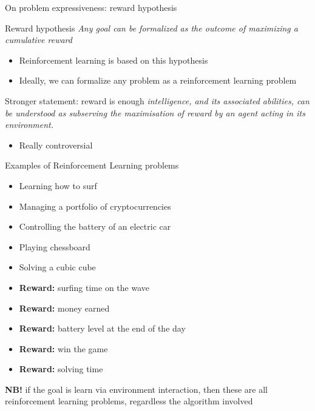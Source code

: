 \documentclass[presentation, 9pt]{beamer}\mode<presentation>{\usetheme{AMSBolognaFC}}
\begin{document}
\begin{frame}{On problem expressiveness: reward hypothesis}
\begin{block}{Reward hypothesis}
\emph{Any goal can be formalized as the outcome of maximizing a cumulative reward}
\begin{itemize}
	\item Reinforcement learning is based on this hypothesis
	\item Ideally, we can formalize any problem as a reinforcement learning problem
\end{itemize}
\end{block}

\begin{alertblock}{Stronger statement: reward is enough}
\emph{intelligence, and its associated abilities, can be understood as subserving the maximisation of reward by an agent acting in its environment.}
\begin{itemize}
	\item Really controversial
\end{itemize}
\end{alertblock}
\end{frame}

\begin{frame}{Examples of Reinforcement Learning problems}
\begin{multicols}{2}
	\begin{itemize}
		\item Learning how to surf
		\item Managing a portfolio of cryptocurrencies
		\item Controlling the battery of an electric car 
		\item Playing chessboard
		\item Solving a cubic cube
	\end{itemize}
	\begin{itemize}
		\item[\faArrowRight] \textbf{Reward:} surfing time on the wave
		\item[\faArrowRight] \textbf{Reward:} money earned
		\item[\faArrowRight] \textbf{Reward:} battery level at the end of the day
		\item[\faArrowRight] \textbf{Reward:} win the game
		\item[\faArrowRight] \textbf{Reward:} solving time 
	\end{itemize}
\end{multicols}
\large
\textbf{NB!} if the goal is learn via environment interaction, then these are all reinforcement learning problems, regardless the algorithm involved
\end{frame}
\end{document}
